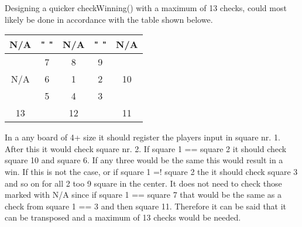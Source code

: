 \documentclass[a4paper,10pt]{article}
\begin{document}
Designing a quicker checkWinning() with a maximum of 13 checks, could most likely be done in accordance with the table shown belowe.   

\centering
\begin{tabular}{|c|c|c|c|c|}
	\hline 
	N/A &"    "& N/A &"    "& N/A \\ 
	\hline 
	& 7 & 8 & 9 &   \\ 
	\hline 
	N/A & 6 & 1 & 2 & 10 \\ 
	\hline 
	& 5 & 4 & 3 &  \\ 
	\hline 
	13 &    & 12 &    & 11 \\ 
	\hline 
\end{tabular} 


\flushleft

In a any board of 4+ size it should register the players input in square nr. 1. After this it would check square nr. 2. If square 1 == square 2 it should check square 10 and square 6. If any three would be the same this would result in a win. If this is not the case, or if square 1 =! square 2 the it should check square 3 and so on for all 2 too 9 square in the center. It does not need to check those marked with N/A since if  square 1 == square 7 that would be the same as a check from square 1 == 3 and then square 11. Therefore it can be said that it can be transposed and a maximum of 13 checks would be needed.  
	
	
	\begin{comment}
	Hvis Fern Time er lavet tilføjes det her og begin og end comment skal fjernes. 
	\textbf{Fern program}
	
	
	\end{comment}
	
\end{document}
